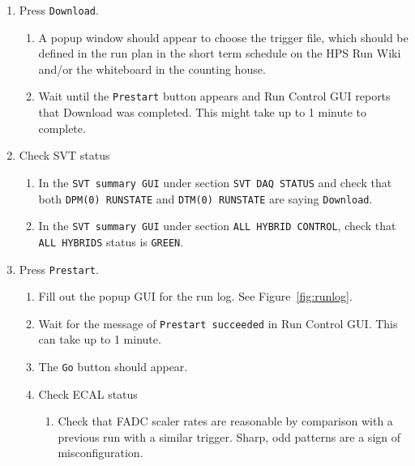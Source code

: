 \documentclass[12pt]{article}
\begin{document}
\begin{enumerate}
\item
\label{item:download}
Press \texttt{Download}.

\begin{enumerate}
\item A popup window should appear to choose the trigger file, which should be defined in the run plan in the short term schedule on the HPS Run Wiki and/or the whiteboard in the counting house.

\item Wait until the \texttt{Prestart} button appears and Run Control GUI reports that Download was completed. This might take up to 1 minute to complete.

\end{enumerate}

\item Check SVT status

\begin{enumerate}
\item In the \texttt{SVT summary GUI} under section \texttt{SVT DAQ STATUS} and check that both \texttt{DPM(0) RUNSTATE} and \texttt{DTM(0) RUNSTATE}  are saying \texttt{Download}.
\item In the \texttt{SVT summary GUI} under section \texttt{ALL HYBRID CONTROL}, check that \texttt{ALL HYBRIDS} status is \texttt{GREEN}.
\end{enumerate}

\item
\label{item:prestart}
Press \texttt{Prestart}.

\begin{enumerate}
\item Fill out the popup GUI for the run log.  See Figure~\ref{fig:runlog}.
\item Wait for the message of \texttt{Prestart succeeded} in Run Control GUI. This can take up to 1 minute.
\item The \texttt{Go} button should appear.

\item Check ECAL status
\begin{enumerate}
\item Check that FADC scaler rates are reasonable by comparison with a previous run with a similar trigger.  Sharp, odd patterns are a sign of misconfiguration.
\end{enumerate}


\end{enumerate}
\end{enumerate}
\end{document}
